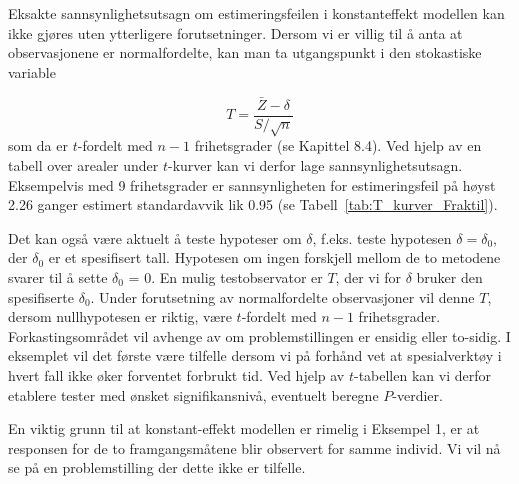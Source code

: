 Eksakte sannsynlighetsutsagn om estimeringsfeilen i konstanteffekt
mo\-del\-len kan ikke gjøres uten ytterligere forutsetninger.  Dersom vi
er villig til å anta at observasjonene er normalfordelte, kan man
ta utgangspunkt i den stokastiske variable

\[  T=\frac{\bar{Z}-\delta}{S/\sqrt{n}}          \]
som da er $t$-fordelt med $n - 1$ frihetsgrader (se Kapittel 8.4).  
Ved hjelp av en tabell over arealer under $t$-kurver kan vi derfor 
lage sannsynlighetsutsagn.  Eksempelvis med 9 frihetsgrader er
sannsynligheten for estimeringsfeil på høyst 2.26 ganger estimert
standardavvik lik 0.95 (se Tabell~\ref{tab:T_kurver_Fraktil}).

Det kan også være aktuelt å teste hypoteser om $\delta$,
f.eks. teste hypotesen $\delta = {\delta}_0$, der ${\delta}_0$ er
et spesifisert tall.  Hypotesen om ingen forskjell mellom de to metodene
svarer til å sette ${\delta}_0$ = 0.  En mulig testobservator er 
$T$, der vi for $\delta$ bruker den spesifiserte ${\delta}_0$.  Under
forutsetning av normalfordelte observasjoner vil denne $T$, dersom 
nullhypotesen er riktig, være $t$-fordelt med $n - 1$ frihetsgrader.
Forkastingsområdet vil avhenge av om problemstillingen er ensidig
eller to-sidig.  I eksemplet vil det første være tilfelle dersom
vi på forhånd vet at spesialverktøy i hvert fall ikke øker
forventet forbrukt tid.  Ved hjelp av $t$-tabellen kan vi derfor etablere
tester med ønsket signifikansnivå, eventuelt beregne $P$-verdier.

En viktig grunn til at konstant-effekt modellen er rimelig i Eksempel 1,
er at responsen for de to framgangsmåtene blir observert for samme
individ.  Vi vil nå se på en problemstilling der dette ikke er 
tilfelle.\\

